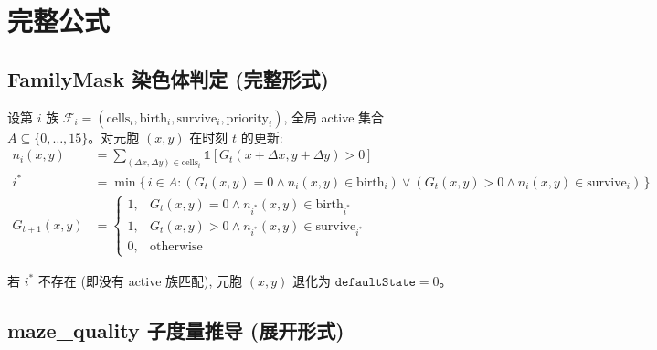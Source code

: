 
\appendix

\section{完整公式}
\label{sec:appendix-a}

\subsection{FamilyMask 染色体判定 (完整形式)}

设第 $i$ 族 $\mathcal{F}_i = (\text{cells}_i, \text{birth}_i, \text{survive}_i, \text{priority}_i)$, 全局 active 集合 $A \subseteq \{0, \ldots, 15\}$。对元胞 $(x, y)$ 在时刻 $t$ 的更新:
\begin{align*}
  n_i(x, y) &= \sum_{(\Delta x, \Delta y) \in \text{cells}_i} \mathbb{1}\!\left[G_t(x + \Delta x, y + \Delta y) > 0\right] \\
  i^* &= \min\bigl\{\,i \in A : (G_t(x,y) = 0 \wedge n_i(x,y) \in \text{birth}_i) \vee (G_t(x,y) > 0 \wedge n_i(x,y) \in \text{survive}_i)\,\bigr\} \\
  G_{t+1}(x, y) &=
  \begin{cases}
    1, & G_t(x, y) = 0 \wedge n_{i^*}(x, y) \in \text{birth}_{i^*} \\
    1, & G_t(x, y) > 0 \wedge n_{i^*}(x, y) \in \text{survive}_{i^*} \\
    0, & \text{otherwise}
  \end{cases}
\end{align*}

若 $i^*$ 不存在 (即没有 active 族匹配), 元胞 $(x, y)$ 退化为 $\texttt{defaultState} = 0$。

\subsection{maze\_quality 子度量推导 (展开形式)}

